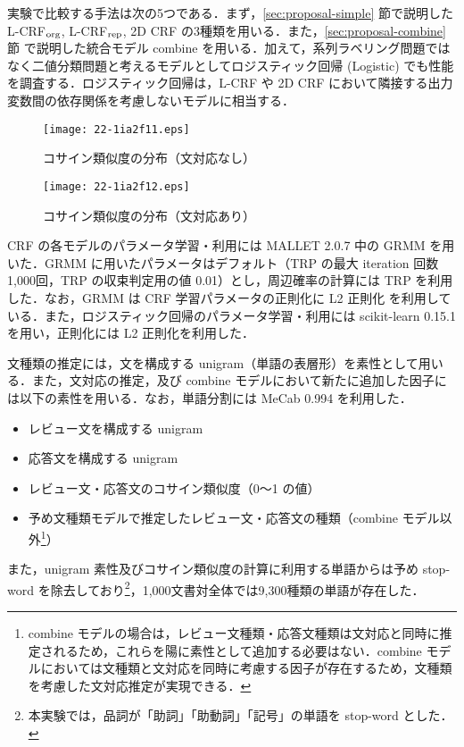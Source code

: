 \documentclass[japanese]{jnlp_1.4}
\begin{document}
実験で比較する手法は次の5つである．まず，\ref{sec:proposal-simple} 節で説明した L-CRF$_{\rm org}$, L-CRF$_{\rm rep}$, 2D CRF の3種類を用いる．また，\ref{sec:proposal-combine} 節 で説明した統合モデル combine を用いる．加えて，系列ラベリング問題ではなく二値分類問題と考えるモデルとしてロジスティック回帰 (Logistic) でも性能を調査する．ロジスティック回帰は，L-CRF や 2D CRF において隣接する出力変数間の依存関係を考慮しないモデルに相当する．

\begin{figure}[t]
\begin{minipage}[b]{0.49\hsize}
\begin{center}
\texttt{[image: 22-1ia2f11.eps]}
\end{center}
\caption{コサイン類似度の分布（文対応なし）}
\label{fig:cossim-dist-f}
\end{minipage}
\begin{minipage}[b]{0.49\hsize}
\begin{center}
\texttt{[image: 22-1ia2f12.eps]}
\end{center}
\caption{コサイン類似度の分布（文対応あり）}
\label{fig:cossim-dist-t}
\end{minipage}
\end{figure}

CRF の各モデルのパラメータ学習・利用には MALLET 2.0.7 \cite{McCallumMALLET2002} 中の GRMM \cite{GRMM2006} を用いた．GRMM に用いたパラメータはデフォルト（TRP の最大 iteration 回数1,000回，TRP の収束判定用の値 0.01）とし，周辺確率の計算には TRP \cite{Wainwright2001b} を利用した．なお，GRMM は CRF 学習パラメータの正則化に L2 正則化 \cite{Chen99agaussian} を利用している．また，ロジスティック回帰のパラメータ学習・利用には scikit-learn 0.15.1 \cite{scikit-learn} を用い，正則化には L2 正則化を利用した．

文種類の推定には，文を構成する unigram（単語の表層形）を素性として用いる．また，文対応の推定，及び combine モデルにおいて新たに追加した因子には以下の素性を用いる．なお，単語分割には MeCab 0.994 \cite{kudo-yamamoto-matsumoto:2004:EMNLP} を利用した．
\begin{itemize}
  \item レビュー文を構成する unigram
  \item 応答文を構成する unigram
  \item レビュー文・応答文のコサイン類似度（0〜1 の値）
  \item 予め文種類モデルで推定したレビュー文・応答文の種類（combine モデル以外\footnote{combine モデルの場合は，レビュー文種類・応答文種類は文対応と同時に推定されるため，これらを陽に素性として追加する必要はない．combine モデルにおいては文種類と文対応を同時に考慮する因子が存在するため，文種類を考慮した文対応推定が実現できる．}）
\end{itemize}
また，unigram 素性及びコサイン類似度の計算に利用する単語からは予め stop-word を除去しており\footnote{本実験では，品詞が「助詞」「助動詞」「記号」の単語を stop-word とした．}，1,000文書対全体では9,300種類の単語が存在した．
\end{document}
